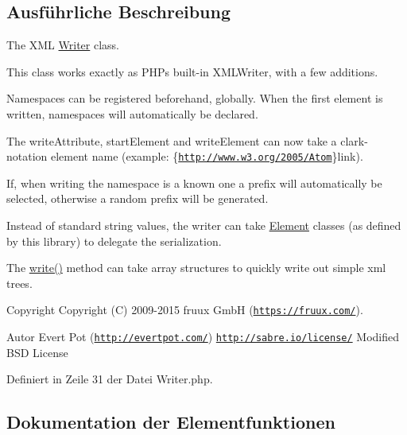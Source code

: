 \subsection{Ausführliche Beschreibung}
The X\+ML \mbox{\hyperlink{class_sabre_1_1_xml_1_1_writer}{Writer}} class.

This class works exactly as P\+HP\textquotesingle{}s built-\/in X\+M\+L\+Writer, with a few additions.

Namespaces can be registered beforehand, globally. When the first element is written, namespaces will automatically be declared.

The write\+Attribute, start\+Element and write\+Element can now take a clark-\/notation element name (example\+: \{\href{http://www.w3.org/2005/Atom}{\tt http\+://www.\+w3.\+org/2005/\+Atom}\}link).

If, when writing the namespace is a known one a prefix will automatically be selected, otherwise a random prefix will be generated.

Instead of standard string values, the writer can take \mbox{\hyperlink{interface_sabre_1_1_xml_1_1_element}{Element}} classes (as defined by this library) to delegate the serialization.

The \mbox{\hyperlink{class_sabre_1_1_xml_1_1_writer_a7ae8afe73ac4ca8d34a609b6ac16da5e}{write()}} method can take array structures to quickly write out simple xml trees.

\begin{DoxyCopyright}{Copyright}
Copyright (C) 2009-\/2015 fruux GmbH (\href{https://fruux.com/}{\tt https\+://fruux.\+com/}). 
\end{DoxyCopyright}
\begin{DoxyAuthor}{Autor}
Evert Pot (\href{http://evertpot.com/}{\tt http\+://evertpot.\+com/})  \href{http://sabre.io/license/}{\tt http\+://sabre.\+io/license/} Modified B\+SD License 
\end{DoxyAuthor}


Definiert in Zeile 31 der Datei Writer.\+php.



\subsection{Dokumentation der Elementfunktionen}
\mbox{\label{class_sabre_1_1_xml_1_1_writer_a36f607e50b1cfff7637bbeeb63093400}} 
